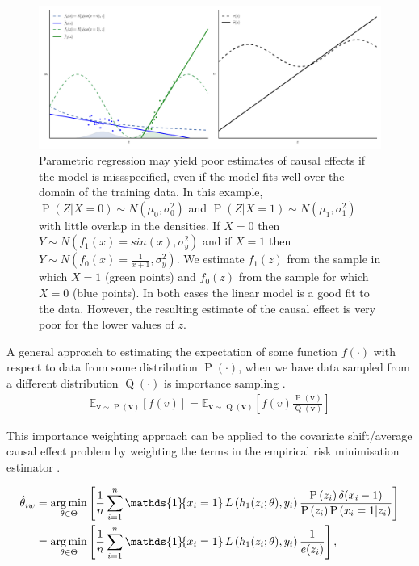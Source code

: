 \documentclass[11pt,a4paper,twoside]{report}
\newcommand{\Q}[1]{\operatorname{Q}\left(#1\right)}
\newcommand{\vb}[1]{\boldsymbol{#1}}
\newcommand{\Esub}[2]{\mathbb E_{#1}\left[{#2}\right]}
\newcommand{\set}[1]{\left\{#1\right\}}
\newcommand{\ind}[1]{\mathds{1}\!\!\set{#1}}
\newcommand{\argmin}{\operatornamewithlimits{arg\,min}}
\newcommand{\eqn}[1]{\begin{align}#1\end{align}}
\renewcommand{\P}[1]{\operatorname{P}\left(#1\right)}
\theoremstyle{plain}
\theoremstyle{definition}
\begin{document}
\begin{figure}[ht]
\centering
\includegraphics[scale=.48]{covariate_shift_estimation.pdf}
\caption{
Parametric regression may yield poor estimates of causal effects if the model is missspecified, even if the model fits well over the domain of the training data. In this example, $\P{Z|X=0} \sim N(\mu_0,\sigma_0^2)$ and $\P{Z|X=1} \sim N(\mu_1,\sigma_1^2)$ with little overlap in the densities. If $X=0$ then $Y \sim N(f_1(x)=sin(x),\sigma_y^2)$ and if $X=1$ then $Y \sim N(f_0(x) = \frac{1}{x+1},\sigma_y^2)$. We estimate $f_1(z)$ from the sample in which $X=1$ (green points) and $f_0(z)$ from the sample for which $X=0$ (blue points). In both cases the linear model is a good fit to the data. However, the resulting estimate of the causal effect is very poor for the lower values of $z$. } 
\label{fig:covariate_shift_adjust}
\end{figure}


A general approach to estimating the expectation of some function $f(\cdot)$ with respect to data from some distribution $\P{\cdot}$, when we have data sampled from a different distribution $\Q{\cdot}$ is importance sampling \citep{horvitz1952generalization,Koller2009}. 
\eqn{
\label{eqn:importance_sampling}
\Esub{\vb{v} \sim \P{\vb{v}}}{f(v)} = \Esub{\vb{v} \sim \Q{\vb{v}}}{f(v)\frac{\P{\vb{v}}}{\Q{\vb{v}}}}
}

This importance weighting approach can be applied to the covariate shift/average causal effect problem by weighting the terms in the empirical risk minimisation estimator \citep{Sugiyama2007}.

\eqn{
\label{eqn:importance_weighted_erm}
\hat{\theta}_{iw} &= \argmin_{\theta \in \Theta}\left[\frac{1}{n}\sum_{i=1}^n \ind{x_i=1} L\left(h_1(z_i;\theta),y_i\right)\frac{\P{z_i}\delta(x_i-1)}{\P{z_i}\P{x_i=1|z_i}}  \right] \\
&= \argmin_{\theta \in \Theta}\left[\frac{1}{n}\sum_{i=1}^n \ind{x_i=1} L\left(h_1(z_i;\theta),y_i\right)\frac{1}{e(z_i)}  \right],
}
\end{document}

